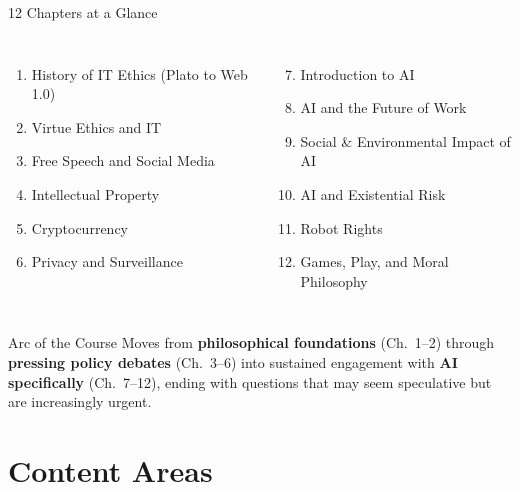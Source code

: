 \documentclass[aspectratio=169,10pt]{beamer}
\begin{document}
\begin{frame}{12 Chapters at a Glance}
\vspace{0.2em}
\begin{columns}[c]
\footnotesize
\begin{enumerate}
  \item History of IT Ethics (Plato to Web 1.0)
  \item Virtue Ethics and IT
  \item Free Speech and Social Media
  \item Intellectual Property
  \item Cryptocurrency
  \item Privacy and Surveillance
\end{enumerate}
\footnotesize
\begin{enumerate}
  \setcounter{enumi}{6}
  \item Introduction to AI
  \item AI and the Future of Work
  \item Social \& Environmental Impact of AI
  \item AI and Existential Risk
  \item Robot Rights
  \item Games, Play, and Moral Philosophy
\end{enumerate}
\end{columns}
\vspace{0.4em}
\begin{block}{Arc of the Course}
\small Moves from \textbf{philosophical foundations} (Ch.~1--2) through \textbf{pressing policy debates} (Ch.~3--6) into sustained engagement with \textbf{AI specifically} (Ch.~7--12), ending with questions that may seem speculative but are increasingly urgent.
\end{block}
\end{frame}

\section{Content Areas}
\end{document}
